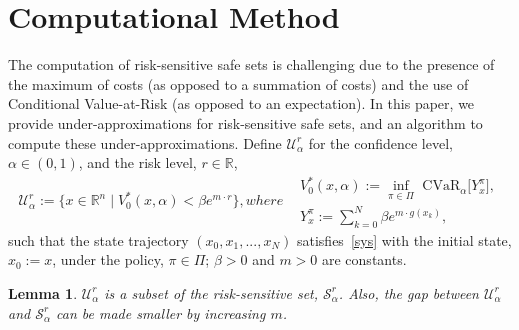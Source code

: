 \documentclass[letterpaper, 10 pt, conference]{ieeeconf}  %
\newtheorem{lemma}{Lemma}
\begin{document}
\section{Computational Method}\label{alg}
The computation of risk-sensitive safe sets is challenging due to the presence of the maximum of costs (as opposed to a summation of costs)
and the use of Conditional Value-at-Risk (as opposed to an expectation). In this paper, we provide under-approximations 
for risk-sensitive safe sets, and an algorithm to compute these under-approximations. Define $\mathcal{U}_\alpha^r$
for the confidence level, $\alpha \in (0,1)$, and the risk level, $r \in \mathbb{R}$,
\begin{subequations}\label{under}\begin{equation}
\mathcal{U}_\alpha^r := \{x \in \mathbb{R}^n \mid V_0^*(x,\alpha) < \beta e^{m\cdot r} \},
\end{equation}
where
\begin{equation}\begin{aligned}
& V_0^*(x,\alpha) := {\underset{\pi \in \Pi}\inf} \text{ CVaR}_\alpha \big[ Y_x^\pi \big],\\
& Y_x^\pi := \textstyle\sum_{k=0}^N \beta e^{m\cdot g(x_k)},
\end{aligned}\end{equation}
\end{subequations}
such that the state trajectory $(x_0, x_1, ..., x_N)$
satisfies~\eqref{sys} with the initial state, $x_0 := x$, under the policy, $\pi \in \Pi$;
$\beta > 0$ and $m > 0$ are constants.
\begin{lemma}\label{lemma2}
$\mathcal{U}_\alpha^r$ is a subset of the risk-sensitive set, $\mathcal{S}_\alpha^r$. 
Also, the gap between $\mathcal{U}_\alpha^r$ and $\mathcal{S}_\alpha^r$ can be made smaller by increasing $m$.
\end{lemma}
\end{document}
